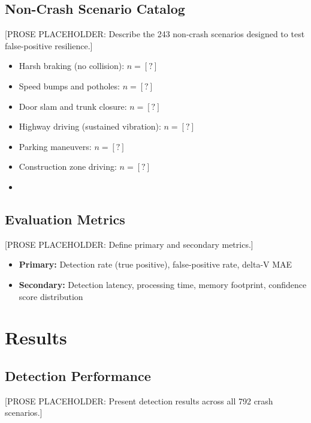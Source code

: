 \documentclass[conference,twocolumn]{IEEEtran}
\begin{document}
\subsection{Non-Crash Scenario Catalog}

[PROSE PLACEHOLDER: Describe the 243 non-crash scenarios designed to test false-positive resilience.]

\begin{itemize}
  \item Harsh braking (no collision): $n = [?]$
  \item Speed bumps and potholes: $n = [?]$
  \item Door slam and trunk closure: $n = [?]$
  \item Highway driving (sustained vibration): $n = [?]$
  \item Parking maneuvers: $n = [?]$
  \item Construction zone driving: $n = [?]$
  \item [Additional non-crash categories: placeholder]
\end{itemize}

\subsection{Evaluation Metrics}

[PROSE PLACEHOLDER: Define primary and secondary metrics.]

\begin{itemize}
  \item \textbf{Primary:} Detection rate (true positive), false-positive rate, delta-V MAE
  \item \textbf{Secondary:} Detection latency, processing time, memory footprint, confidence score distribution
\end{itemize}

\section{Results}

\subsection{Detection Performance}

[PROSE PLACEHOLDER: Present detection results across all 792 crash scenarios.]
\end{document}
